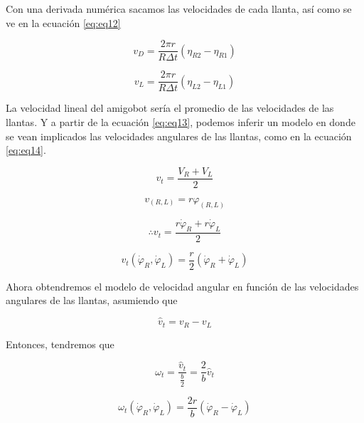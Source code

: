 \documentclass[spanish,10pt,letterpaper, twocolumn]{article}
\begin{document}
Con una derivada num\'erica sacamos las velocidades de cada llanta, as\'i como se ve en la ecuaci\'on \eqref{eq:eq12}

\begin{equation*}
	\label{eq:eq11}
	v_D=\frac{2\pi r}{R \Delta t}(\eta_{R2}-\eta_{R1})
\end{equation*}

\begin{equation}
	\label{eq:eq12}
	v_L=\frac{2\pi r}{R \Delta t}(\eta_{L2}-\eta_{L1})
\end{equation}

La velocidad lineal del amigobot ser\'ia el promedio de las velocidades de las llantas. Y a partir de la ecuaci\'on \eqref{eq:eq13}, podemos inferir un modelo en donde se vean implicados las velocidades angulares de las llantas, como en la ecuaci\'on \eqref{eq:eq14}.


\begin{equation}
	\label{eq:eq13}
	v_t=\frac{V_R+V_L}{2}
\end{equation}

\begin{equation*}
	v_{(R,L)}=r \varphi_{(R,L)}
\end{equation*}

\begin{equation*}
	\therefore v_t=\frac{r\dot{\varphi}_R+r\dot{\varphi}_L}{2}
\end{equation*}

\begin{equation}
	\label{eq:eq14}
	v_t(\dot{\varphi}_R,\dot{\varphi}_L)=\frac{r}{2}(\dot{\varphi}_R+\dot{\varphi}_L)
\end{equation}

Ahora obtendremos el modelo de velocidad angular en funci\'on de las velocidades angulares de las llantas, asumiendo que 

\begin{equation}
	\label{eq:eq15}
	\hat{v}_t=v_R-v_L
\end{equation}

Entonces, tendremos que

\begin{equation}
	\label{eq:eq16}
	\omega_t=\frac{\hat{v}_t}{\frac{b}{2}}=\frac{2}{b}\hat{v}_t
\end{equation}

\begin{equation}
	\label{eq:eq17}
	\omega_t(\dot{\varphi}_R,\dot{\varphi}_L)=\frac{2r}{b}(\dot{\varphi}_R-\dot{\varphi}_L)
\end{equation}
\end{document}
